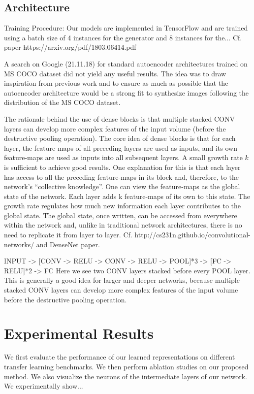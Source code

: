 \documentclass[10pt,letterpaper]{article}
\begin{document}
\subsection{Architecture}
Training Procedure: Our models are implemented in TensorFlow \cite{1605.08695} and are trained using a batch size of 4 instances for the generator and 8 instances for the...
Cf. paper https://arxiv.org/pdf/1803.06414.pdf

\par A search on Google (21.11.18) for standard autoencoder architectures trained on MS COCO dataset did not yield any useful results. The idea was to draw inspiration from previous work and to ensure as much as possible that the autoencoder architecture would be a strong fit to synthesize images following the distribution of the MS COCO dataset.

\par The rationale behind the use of dense blocks is that multiple stacked CONV layers can develop more complex features of the input volume (before the destructive pooling operation). The core idea of dense blocks is that for each layer, the feature-maps of all preceding layers are used as inputs, and its own feature-maps are used as inputs into all subsequent layers. A small growth rate $k$ is sufficient to achieve good results. One explanation for this is that each layer has access to all the preceding feature-maps in its block and, therefore, to the network’s “collective knowledge”. One can view the feature-maps as the global state of the network. Each layer adds k feature-maps of its own to this state. The growth
rate regulates how much new information each layer contributes to the global state. The global state, once written, can be accessed from everywhere within the network and, unlike in traditional network architectures, there is no need to replicate it from layer to layer.
Cf. http://cs231n.github.io/convolutional-networks/ and DenseNet paper.

\par INPUT -> [CONV -> RELU -> CONV -> RELU -> POOL]*3 -> [FC -> RELU]*2 -> FC
Here we see two CONV layers stacked before every POOL layer. This is generally a good
idea for larger and deeper networks, because multiple stacked CONV layers can develop
more complex features of the input volume before the destructive pooling operation.

\section{Experimental Results}
We first evaluate the performance of our learned representations on different
transfer learning benchmarks. We then perform ablation studies on our proposed
method. We also visualize the neurons of the intermediate layers of our network.
We experimentally show...
\end{document}
